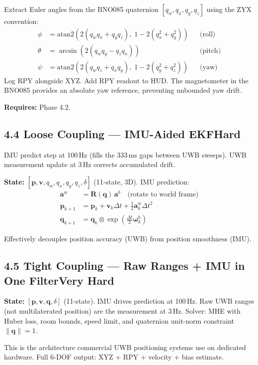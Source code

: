 \documentclass[11pt,a4paper]{article}
\newcommand{\mat}[1]{\mathbf{#1}}
\newcommand{\vect}[1]{\mathbf{#1}}
\newcommand{\dif}[1]{\texorpdfstring{\hfill#1}{}}
\newcommand{\hard}{\textcolor{dkred}{\textbf{Hard}}}
\newcommand{\vhard}{\textcolor{dkred}{\textbf{Very Hard}}}
\begin{document}
Extract Euler angles from the BNO085 quaternion $[q_w, q_x, q_y, q_z]$ using the ZYX convention:
\begin{align*}
\phi   &= \text{atan2}\!\left(2(q_wq_x + q_yq_z),\; 1-2(q_x^2+q_y^2)\right) && \text{(roll)} \\
\theta &= \arcsin\!\left(2(q_wq_y - q_zq_x)\right) && \text{(pitch)} \\
\psi   &= \text{atan2}\!\left(2(q_wq_z + q_xq_y),\; 1-2(q_y^2+q_z^2)\right) && \text{(yaw)}
\end{align*}
Log RPY alongside XYZ. Add RPY readout to HUD. The magnetometer in the BNO085 provides an absolute yaw reference, preventing unbounded yaw drift.

\textbf{Requires:} Phase 4.2.

\subsection{4.4 Loose Coupling --- IMU-Aided EKF\dif{\hard}}

IMU predict step at 100\,Hz (fills the 333\,ms gaps between UWB sweeps). UWB measurement update at 3\,Hz corrects accumulated drift.

\textbf{State:} $[\vect{p}, \vect{v}, q_w, q_x, q_y, q_z, \delta]$ (11-state, 3D). IMU prediction:
\begin{align*}
\vect{a}^w &= \mat{R}(\vect{q})\,\vect{a}^b \quad\text{(rotate to world frame)} \\
\vect{p}_{k+1} &= \vect{p}_k + \vect{v}_k\Delta t + \tfrac{1}{2}\vect{a}^w_k\Delta t^2 \\
\vect{q}_{k+1} &= \vect{q}_k \otimes \exp\!\left(\tfrac{\Delta t}{2}\vect{\omega}^b_k\right)
\end{align*}

Effectively decouples position accuracy (UWB) from position smoothness (IMU).

\subsection{4.5 Tight Coupling --- Raw Ranges + IMU in One Filter\dif{\vhard}}

\textbf{State:} $[\vect{p}, \vect{v}, \vect{q}, \delta]$ (11-state). IMU drives prediction at 100\,Hz. Raw UWB ranges (not multilaterated position) are the measurement at 3\,Hz. Solver: MHE with Huber loss, room bounds, speed limit, and quaternion unit-norm constraint $\|\vect{q}\| = 1$.

This is the architecture commercial UWB positioning systems use on dedicated hardware. Full 6-DOF output: XYZ + RPY + velocity + bias estimate.
\end{document}
